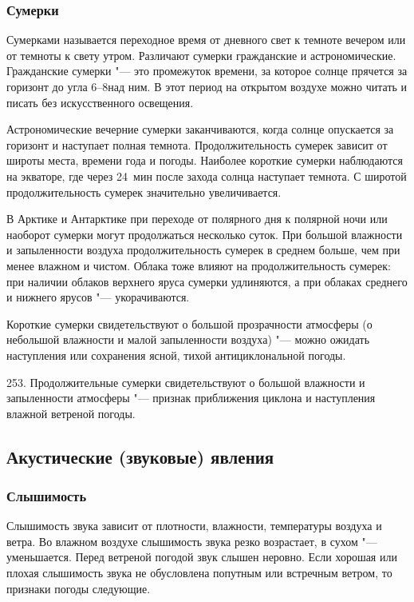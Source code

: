 \subsubsection{Сумерки}

Сумерками называется переходное время от дневного свет к темноте
вечером или от темноты к свету утром. Различают сумерки гражданские и
астрономические. Гражданские сумерки "--- это промежуток времени, за
которое солнце прячется за горизонт до угла 6--8\gr над ним. В этот
период на открытом воздухе можно читать и писать без искусственного
освещения.

Астрономические вечерние сумерки заканчиваются, когда солнце
опускается за горизонт и наступает полная темнота. Продолжительность
сумерек зависит от широты места, времени года и погоды. Наиболее
короткие сумерки наблюдаются на экваторе, где через 24~мин после
захода солнца наступает темнота. С широтой продолжительность сумерек
значительно увеличивается.

В Арктике и Антарктике при переходе от полярного дня к полярной ночи
или наоборот сумерки могут продолжаться несколько суток. При большой
влажности и запыленности воздуха продолжительность сумерек в среднем
больше, чем при менее влажном и чистом. Облака тоже влияют на
продолжительность сумерек: при наличии облаков верхнего яруса сумерки
удлиняются, а при облаках среднего и нижнего ярусов "--- укорачиваются.

 Короткие сумерки свидетельствуют о большой прозрачности
атмосферы (о небольшой влажности и малой запыленности воздуха) "--- можно
ожидать наступления или сохранения ясной, тихой антициклональной
погоды.

253. Продолжительные сумерки свидетельствуют о большой влажности и
запыленности атмосферы "--- признак приближения циклона и наступления
влажной ветреной погоды.

\subsection{Акустические (звуковые) явления}

\subsubsection{Слышимость}

Слышимость звука зависит от плотности, влажности, температуры воздуха
и ветра. Во влажном воздухе слышимость звука резко возрастает, в сухом
"--- уменьшается. Перед ветреной погодой звук слышен неровно. Если
хорошая или плохая слышимость звука не обусловлена попутным или
встречным ветром, то признаки погоды следующие.

